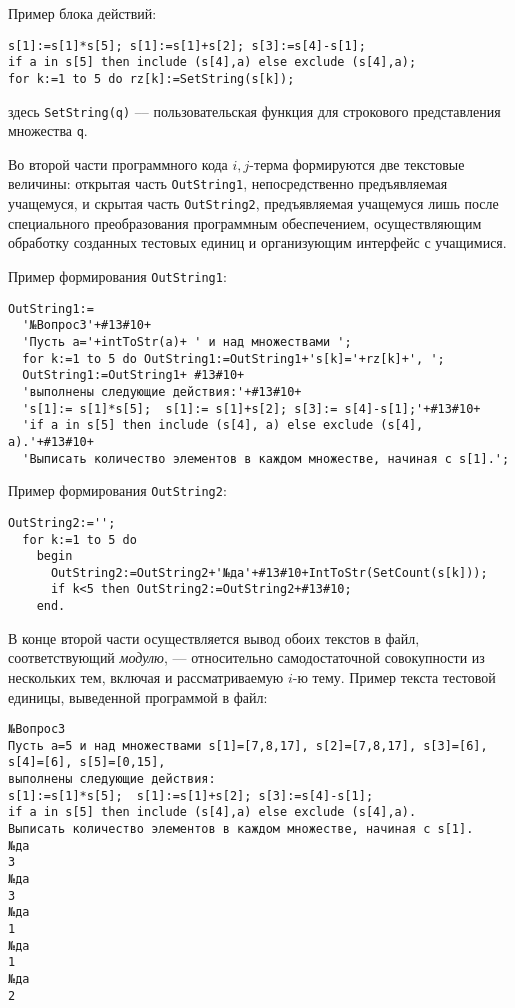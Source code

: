 Пример блока действий:
\par\smallskip
\begin{verbatim}
s[1]:=s[1]*s[5]; s[1]:=s[1]+s[2]; s[3]:=s[4]-s[1];
if a in s[5] then include (s[4],a) else exclude (s[4],a);
for k:=1 to 5 do rz[k]:=SetString(s[k]);
\end{verbatim}
здесь \verb'SetString(q)' --– пользовательская функция для строкового представления множества \verb'q'.
\par\smallskip
Во второй части программного кода $i,j$-терма формируются две текстовые величины: открытая часть \verb'OutString1', непосредственно предъявляемая учащемуся, и скрытая часть \verb'OutString2', предъявляемая учащемуся лишь после специального преобразования программным обеспечением, осуществляющим обработку созданных тестовых единиц и организующим интерфейс с учащимися.

Пример формирования \verb'OutString1':
\par\smallskip
\begin{verbatim}
OutString1:=
  '№Вопрос3'+#13#10+
  'Пусть a='+intToStr(a)+ ' и над множествами ';
  for k:=1 to 5 do OutString1:=OutString1+'s[k]='+rz[k]+', ';
  OutString1:=OutString1+ #13#10+
  'выполнены следующие действия:'+#13#10+
  's[1]:= s[1]*s[5];  s[1]:= s[1]+s[2]; s[3]:= s[4]-s[1];'+#13#10+
  'if a in s[5] then include (s[4], a) else exclude (s[4], a).'+#13#10+
  'Выписать количество элементов в каждом множестве, начиная с s[1].';
\end{verbatim}

Пример формирования \verb'OutString2':
\par\smallskip
\begin{verbatim}
OutString2:='';
  for k:=1 to 5 do
    begin
      OutString2:=OutString2+'№да'+#13#10+IntToStr(SetCount(s[k]));
      if k<5 then OutString2:=OutString2+#13#10;
    end.
\end{verbatim}

В конце второй части осуществляется вывод обоих текстов в файл, соответствующий \textit{ модулю}, --- относительно самодостаточной совокупности из нескольких тем, включая и рассматриваемую $i$-ю тему.
Пример текста тестовой единицы, выведенной программой в файл:
\par\smallskip
\begin{verbatim}
№Вопрос3
Пусть a=5 и над множествами s[1]=[7,8,17], s[2]=[7,8,17], s[3]=[6],
s[4]=[6], s[5]=[0,15],
выполнены следующие действия:
s[1]:=s[1]*s[5];  s[1]:=s[1]+s[2]; s[3]:=s[4]-s[1];
if a in s[5] then include (s[4],a) else exclude (s[4],a).
Выписать количество элементов в каждом множестве, начиная с s[1].
№да
3
№да
3
№да
1
№да
1
№да
2
\end{verbatim}

